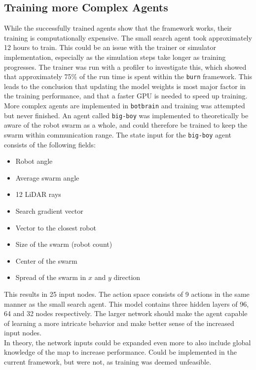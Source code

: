 \subsection{Training more Complex Agents}
While the successfully trained agents show that the framework works, their training is computationally expensive. The small search agent took approximately 12 hours to train. This could be an issue with the trainer or simulator implementation, especially as the simulation steps take longer as training progresses. The trainer was run with a profiler to investigate this, which showed that approximately 75\% of the run time is spent within the \texttt{burn} framework. This leads to the conclusion that updating the model weights is most major factor in the training performance, and that a faster GPU is needed to speed up training. \\

More complex agents are implemented in \texttt{botbrain} and training was attempted but never finished. An agent called \texttt{big-boy} was implemented to theoretically be aware of the robot swarm as a whole, and could therefore be trained to keep the swarm within communication range. The state input for the \texttt{big-boy} agent consists of the following fields:

\begin{itemize}
    \item Robot angle
    \item Average swarm angle
    \item 12 LiDAR rays
    \item Search gradient vector
    \item Vector to the closest robot
    \item Size of the swarm (robot count)
    \item Center of the swarm
    \item Spread of the swarm in $x$ and $y$ direction
\end{itemize}

This results in 25 input nodes. The action space consists of 9 actions in the same manner as the small search agent. This model contains three hidden layers of 96, 64 and 32 nodes respectively. The larger network should make the agent capable of learning a more intricate behavior and make better sense of the increased input nodes. \\

In theory, the network inputs could be expanded even more to also include global knowledge of the map to increase performance. Could be implemented in the current framework, but were not, as training was deemed unfeasible.
